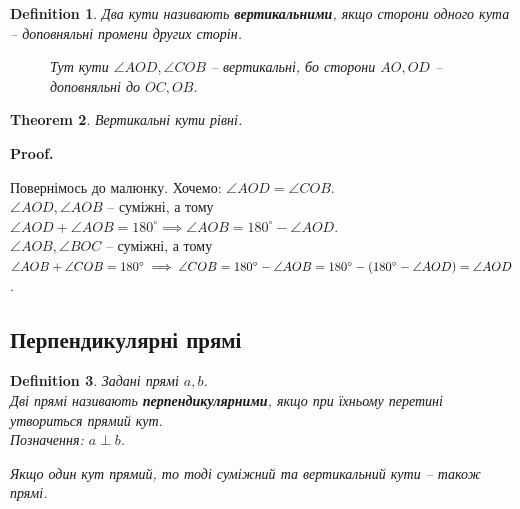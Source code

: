 \documentclass[a4paper, 10pt]{article}
\makeatletter
\theoremstyle{theoremdd}
\newtheorem{theorem}{Theorem}[subsection]
\theoremstyle{theoremdd}
\theoremstyle{theoremdd}
\newtheorem{definition}[theorem]{Definition}
\theoremstyle{theoremdd}
\theoremstyle{theoremdd}
\theoremstyle{theoremdd}
\theoremstyle{theoremdd}
\theoremstyle{theoremdd}
\theoremstyle{theoremdd}
\renewenvironment{proof}[1][Proof.\\]{\par
\pushQED{\hfill \qed}%
\normalfont \topsep6\p@\@plus6\p@\relax
\trivlist
\item\relax
{\bfseries
#1\@addpunct{.}}\hspace\labelsep\ignorespaces
}{%
\popQED\endtrivlist\@endpefalse
}
\makeatother
\begin{document}
\begin{definition}
Два кути називають \textbf{вертикальними}, якщо сторони одного кута -- доповняльні промени других сторін.
\begin{figure}[H]
\centering
{}
\caption*{Тут кути $\angle AOD, \angle COB$ -- вертикальні, бо сторони $AO,OD$ -- доповняльні до $OC, OB$.}
\end{figure}
\end{definition}

\begin{theorem}
Вертикальні кути рівні.
\end{theorem}

\begin{proof}
Повернімось до малюнку. Хочемо: $\angle AOD = \angle COB$.\\
$\angle AOD, \angle AOB$ -- суміжні, а тому $\angle AOD + \angle AOB = 180^{\circ} \implies \angle AOB = 180^{\circ} - \angle AOD$.\\
$\angle AOB, \angle BOC$ -- суміжні, а тому $\angle AOB + \angle COB = 180^{\circ} \\ \implies \angle COB = 180^{\circ} - \angle AOB = 180^{\circ} - (180^{\circ} - \angle AOD) = \angle AOD$.
\end{proof}

\subsection{Перпендикулярні прямі}
\begin{definition}
Задані прямі $a,b$.\\
Дві прямі називають \textbf{перпендикулярними}, якщо при їхньому перетині утвориться прямий кут.\\
Позначення: $a \perp b$.
\begin{figure}[H]
\centering
{}
\end{figure}
Якщо один кут прямий, то тоді суміжний та вертикальний кути -- також прямі.
\end{definition}
\end{document}
